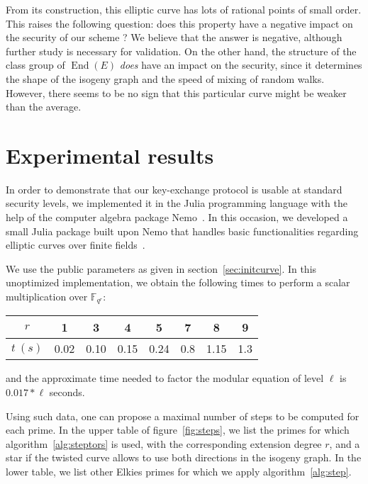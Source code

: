 \documentclass{article}
\newcommand{\F}{\mathbb{F}}
\theoremstyle{definition}
\DeclareMathOperator{\End}{End}
\begin{document}
From its construction, this elliptic curve has lots of rational
points of small order. This raises the following question: does
this property have a negative impact on the security of our scheme ?
We believe that the answer is negative, although further study
is necessary for validation.
On the other hand, the structure of the class group of $\End(E)$
\emph{does} have an impact on the security, since it determines the
shape of the isogeny graph and the speed of mixing of random walks.
However, there seems to be no sign that this particular curve
might be weaker than the average.

\section{Experimental results}
\label{sec:exp}

In order to demonstrate that our key-exchange protocol is usable
at standard security levels, we implemented it in the Julia
programming language with the help of the computer algebra package
Nemo~\cite{todo:Nemo}. In this occasion, we developed a small
Julia package built upon Nemo that handles basic functionalities
regarding elliptic curves over finite fields~\cite{todo:package}.

We use the public parameters as given in
section~\ref{sec:initcurve}.
In this unoptimized implementation, we obtain
the following times to perform a scalar multiplication over $\F_{q^r}$:

\begin{center}
\begin{tabular}{c|ccccccc}
$r$ & 1 & 3 & 4 & 5 & 7 & 8 & 9 \\
\hline
$t\ (s)$ & 0.02 & 0.10 & 0.15 & 0.24 & 0.8 & 1.15 & 1.3
\end{tabular}
\end{center}

and the approximate time needed to factor the modular equation of level $\ell$
is $0.017 * \ell$ seconds.

Using such data, one can propose a maximal number of steps to be
computed for each prime. In the upper table of figure~\ref{fig:steps}, we
list the primes for which algorithm~\ref{alg:steptors} is used, with
the corresponding extension degree $r$, and a star if the twisted curve
allows to use both directions in the isogeny graph. In the lower table,
we list other Elkies primes for which we apply algorithm~\ref{alg:step}.
\end{document}
